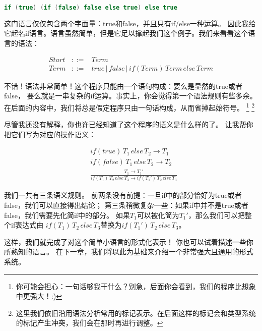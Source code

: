 \documentclass[../main.tex]{subfiles}
\begin{document}
\begin{lstlisting}[language=c++]
if (true) (if (false) false else true) else true
\end{lstlisting}

  \indent 这门语言仅仅包含两个字面量：true和false，并且只有if/else一种运算。
  因此我给它起名if语言。语言虽然简单，但是它足以撑起我们这个例子。我们来看看这个语言的语法：

  \begin{eqnarray}
    Start & ::= & Term \nonumber \\
    Term & ::= & true\,|\,false\,|\,if(Term)\,Term\,else\,Term \nonumber
  \end{eqnarray}

  \indent 不错！语法非常简单！这个程序只能由一个语句构成：要么是显然的true或者false，
  要么就是一串复杂的if运算。事实上，你会觉得第一个语法规则有些多余。
  在后面的内容中，我们将总是假定程序只由一句话构成，从而省掉起始符号。
  \footnote[2]{你可能会担心：一句话够我干什么？别急，后面你会看到，我们的程序比想象中更强大！:)}
  \footnote[3]{这里我们依旧沿用语法分析常用的标记表示。在后面这样的标记会和类型系统的标记产生冲突，我们会在那时再进行调整。}

  \indent 尽管我还没有解释，你也许已经知道了这个程序的语义是什么样的了。
  让我帮你把它们写为对应的操作语义：

  \begin{eqnarray}
    & if (true)\, T_1\,else\,T_2 \to T_1 \nonumber \\
    & if (false)\, T_1\,else\,T_2 \to T_2 \nonumber \\
    & \frac{T_1 \to T_1'}{if(T_1)\,T_2\,else\,T_3 \to if(T_1')\,T_2\,else\,T_3} \nonumber
  \end{eqnarray}

  \indent 我们一共有三条语义规则。
  前两条没有前提：一旦if中的部分恰好为true或者false，我们可以直接得出结论；
  第三条稍微复杂一些：如果if中并不是true或者false，我们需要先化简if中的部分。
  如果$T_1$可以被化简为$T_1'$，那么我们可以把整个if表达式由
  $if(T_1)\,T_2\,else\,T_3$替换为$if(T_1')\,T_2\,else\,T_3$。

  \indent 这样，我们就完成了对这个简单小语言的形式化表示！
  你也可以试着描述一些你所熟知的语言。
  在下一章，我们将以此为基础来介绍一个非常强大且通用的形式系统。
\end{document}
